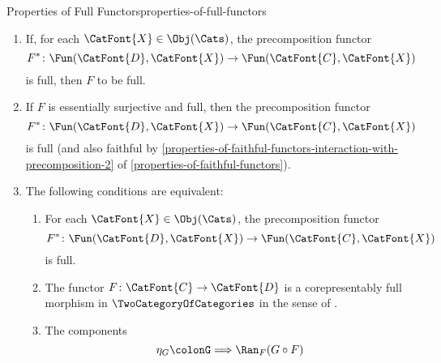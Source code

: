 \begin{proposition}{Properties of Full Functors}{properties-of-full-functors}
\begin{enumerate}
        \item\label{properties-of-full-functors-interaction-with-precomposition-2}If, for each $\CatFont{X}\in\Obj(\Cats)$, the precomposition functor
            \[
                F^{*}
                \colon
                \Fun(\CatFont{D},\CatFont{X})
                \to
                \Fun(\CatFont{C},\CatFont{X})
            \]%
            is full, then $F$  to be full.
        \item\label{properties-of-full-functors-interaction-with-precomposition-3}If $F$ is essentially surjective and full, then the precomposition functor
            \[
                F^{*}
                \colon
                \Fun(\CatFont{D},\CatFont{X})
                \to
                \Fun(\CatFont{C},\CatFont{X})
            \]%
            is full (and also faithful by \cref{properties-of-faithful-functors-interaction-with-precomposition-2} of \cref{properties-of-faithful-functors}).
        \item\label{properties-of-full-functors-interaction-with-precomposition-4}The following conditions are equivalent:
            \begin{enumerate}
                \item\label{properties-of-full-functors-interaction-with-precomposition-4-a}For each $\CatFont{X}\in\Obj(\Cats)$, the precomposition functor
                    \[
                        F^{*}
                        \colon
                        \Fun(\CatFont{D},\CatFont{X})
                        \to
                        \Fun(\CatFont{C},\CatFont{X})
                    \]%
                    is full.
                \item\label{properties-of-full-functors-interaction-with-precomposition-4-b}The functor $F\colon\CatFont{C}\to\CatFont{D}$ is a corepresentably full morphism in $\TwoCategoryOfCategories$ in the sense of .
                \item\label{properties-of-full-functors-interaction-with-precomposition-4-c}The components
                    \[
                        \eta_{G}%
                        \colon%
                        G%
                        \Longrightarrow%
                        \Ran_{F}(G\circ F)%
\]
\end{enumerate}
\end{enumerate}
\end{proposition}
